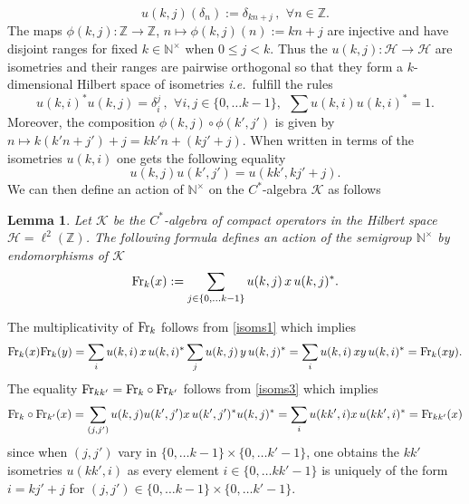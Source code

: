 \documentclass[noams,lp]{compositio}
\newtheorem{lem}[thm]{Lemma}
\def\N{{\mathbb N}}
\def\Z{{\mathbb Z}}
\def\cH{{\mathcal H}}
\def\cK{{\mathcal K}}
\def\qqq{\,,\,~\forall}
\newcommand{\ie}{{\it i.e.\/}\ }
\def\fr{{\rm Fr}}
\def\nt{\N^{\times}}
\begin{document}
\begin{equation}\label{isoms}
u(k,j)(\delta_n):=\delta_{kn+j} \qqq n\in\Z.
\end{equation}
The maps $\phi(k,j):\Z\to \Z$, $n\mapsto \phi(k,j)(n):= kn+j$ are injective and have disjoint ranges for fixed $k\in \nt$ when $0\leq j<k$. Thus the $u(k,j):\cH\to \cH$ are isometries and their ranges are pairwise orthogonal so that they form a $k$-dimensional  Hilbert space of isometries \ie fulfill the  rules 
\begin{equation}\label{isoms1}
u(k,i)^*u(k,j)=\delta_i^j\qqq i, j \in \{0,\ldots k-1\}, \ \ \sum u(k,i)u(k,i)^*=1.
\end{equation}
Moreover, the composition $\phi(k,j)\circ\phi(k',j')$ is given by $n\mapsto k(k'n+j')+j=kk'n+(kj'+j)$. When written in terms of the isometries $u(k,i)$ one gets the following equality 
\begin{equation}\label{isoms3}
 u(k,j)u(k',j')=u(kk',kj'+j).
\end{equation}
We can then define an action of $\nt$ on the $C^*$-algebra $\cK$ as follows
\begin{lem}\label{isoms2} Let $\cK$ be the $C^*$-algebra of compact operators in the Hilbert space $\cH=\ell^2(\Z)$. The following formula defines an action of the semigroup $\nt$ by endomorphisms of $\cK$
\begin{equation}\label{isoms4}
\fr_k(x):=\sum_{j\in\{0,\ldots k-1\}}u(k,j)\, x\, u(k,j)^*.
\end{equation}
\end{lem}
\proof The multiplicativity of $\fr_k$ follows from \eqref{isoms1} which implies
$$
\fr_k(x)\fr_k(y)=\sum_{i}u(k,i)\, x\, u(k,i)^*\sum_{j}u(k,j)\, y\, u(k,j)^*=\sum_{i}u(k,i)\, xy\, u(k,i)^*=\fr_k(xy).
$$
The equality $\fr_{kk'}=\fr_k \circ\fr_{k'}$ follows from \eqref{isoms3} which implies
$$
\fr_k \circ\fr_{k'}(x)=\sum_{(j,j')}  u(k,j)u(k',j')x \,u(k',j')^*u(k,j)^*=\sum_i u(kk',i)x\,u(kk',i)^*=\fr_{kk'}(x)
$$
since when $(j,j')$ vary in $\{0,\ldots k-1\}\times \{0,\ldots k'-1\}$, one obtains the $kk'$ isometries  $u(kk',i)$ as every element  $i \in \{0,\ldots kk'-1\}$ is uniquely of the form $i=kj'+j$ for $(j,j')\in\{0,\ldots k-1\}\times \{0,\ldots k'-1\}$.\endproof
\end{document}
